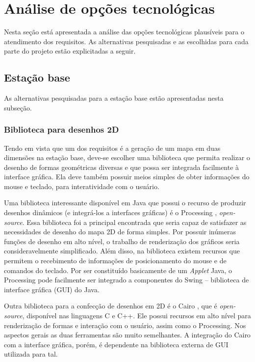 \section{Análise de opções tecnológicas}

Nesta seção está apresentada a análise das opções tecnológicas plausíveis para o atendimento dos requisitos. As alternativas pesquisadas e as escolhidas para cada parte do projeto estão explicitadas a seguir.

\subsection{Estação base}

As alternativas pesquisadas para a estação base estão apresentadas nesta subseção.

\subsubsection{Biblioteca para desenhos 2D}
\label{subsec:alternativas_desenho}

Tendo em vista que um dos requisitos é a geração de um mapa em duas dimensões na estação base, deve-se escolher uma biblioteca que permita realizar o desenho de formas geométricas diversas e que possa ser integrada facilmente à interface gráfica. Ela deve também possuir meios simples de obter informações do mouse e teclado, para interatividade com o usuário. 

Uma biblioteca interessante disponível em Java que possui o recurso de produzir desenhos dinâmicos (e integrá-los a interfaces gráficas) é o Processing \cite{processing}, \textit{open-source}. Essa biblioteca foi a principal encontrada que seria capaz de satisfazer as necessidades de desenho do mapa 2D de forma simples. Por possuir inúmeras funções de desenho em alto nível, o trabalho de renderização dos gráficos seria consideravelmente simplificado. Além disso, na biblioteca existem recursos que permitem o recebimento de informações de posicionamento do mouse e de comandos do teclado. Por ser constituído basicamente de um \textit{Applet} Java, o Processing pode facilmente ser integrado a componentes do Swing -- biblioteca de interface gráfica (GUI) do Java.


Outra biblioteca para a confecção de desenhos em 2D é o Cairo \cite{cairo}, que é \textit{open-source}, disponível nas linguagens C e C++. Ele possui recursos em alto nível para renderização de formas e interação com o usuário, assim como o Processing. Nos aspectos gerais as duas ferramentas são muito semelhantes. A integração do Cairo com a interface gráfica, porém, é dependente na biblioteca externa de GUI utilizada para tal.

